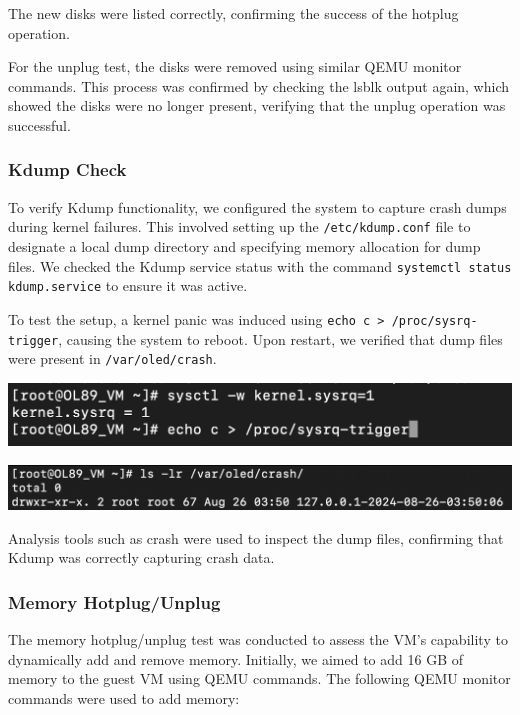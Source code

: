 The new disks were listed correctly, confirming the success of the hotplug operation.\mynewline

For the unplug test, the disks were removed using similar QEMU monitor commands. This process was confirmed by checking the lsblk output again, which showed the disks were no longer present, verifying that the unplug operation was successful.


\subsubsection[Kdump Check]{Kdump Check}
To verify Kdump functionality, we configured the system to capture crash dumps during kernel failures. This involved setting up the \texttt{/etc/kdump.conf} file to designate a local dump directory and specifying memory allocation for dump files. We checked the Kdump service status with the command \texttt{systemctl status kdump.service} to ensure it was active.\mynewline

To test the setup, a kernel panic was induced using \texttt{echo c > /proc/sysrq-trigger}, causing the system to reboot. Upon restart, we verified that dump files were present in \texttt{/var/oled/crash}.

\begin{center}
    \centering
    \includegraphics[width=\textwidth]{Images/Launch Kdump.png}
    \label{fig}
\end{center}

\begin{center}
    \centering
    \includegraphics[width=\textwidth]{Images/Crash Folder.png}
    \label{fig}
\end{center}

Analysis tools such as crash were used to inspect the dump files, confirming that Kdump was correctly capturing crash data.


\subsubsection[Memory Hotplug/Unplug]{Memory Hotplug/Unplug}
The memory hotplug/unplug test was conducted to assess the VM’s capability to dynamically add and remove memory. Initially, we aimed to add 16 GB of memory to the guest VM using QEMU commands. The following QEMU monitor commands were used to add memory:


